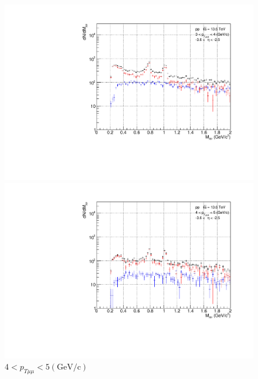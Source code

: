 \begin{figure}[H]
                    \\
                    \vspace{1em}
                    \begin{minipage}{0.45\textwidth}
                        \centering
                        \includegraphics[width=\textwidth]{fig/3_4_1_CB_pt_3to4.pdf}
                        \caption*{$3 < p_{T\mu\mu} < 4 (\mathrm{GeV/c})$}
                    \end{minipage}
                    \hfill
                    \begin{minipage}{0.45\textwidth}
                        \centering
                        \includegraphics[width=\textwidth]{fig/3_4_1_CB_pt_4to5.pdf}
                        \caption*{$4 < p_{T\mu\mu} < 5 (\mathrm{GeV/c})$}
                    \end{minipage}

\end{figure}
